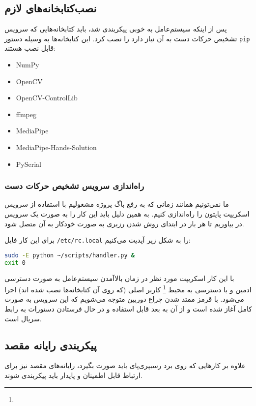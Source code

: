 \documentclass{article}
\begin{document}
\subsection{نصب‌کتابخانه‌های لازم}
پس از اینکه سیستم‌عامل به خوبی پیکربندی شد، باید کتابخانه‌هایی که سرویس تشخیص حرکات دست به آن نیاز دارد را نصب کرد. این کتابخانه‌ها به وسیله دستور
\verb~pip~
قابل نصب هستند:
\begin{latin}
    \begin{itemize}
        \item NumPy
        \item OpenCV
        \item OpenCV-ControlLib
        \item ffmpeg
        \item MediaPipe
        \item MediaPipe-Hands-Solution
        \item PySerial
    \end{itemize}
\end{latin}

\subsubsection{راه‌اندازی سرویس تشخیص حرکات دست}
ما نمی‌تونیم همانند زمانی که به رفع باگ پروژه مشغولیم با استفاده از سرویس 
اسکریپت پایتون را راه‌اندازی کنیم. به همین دلیل باید این کار را به صورت یک سرویس در بیاوریم
تا هر بار در ابتدای روش شدن رزبری به صورت خودکار به آن متصل شود.

برای این کار فایل
\verb~/etc/rc.local~
را به شکل زیر آپدیت می‌کنیم:
\begin{latin}
\begin{lstlisting}[language=bash]
sudo -E python ~/scripts/handler.py &
exit 0
\end{lstlisting}	
\end{latin}

با این کار اسکریپت مورد نظر در زمان بالاآمدن سیستم‌عامل به صورت دسترسی ادمین و با دسترسی به
محیط \footnote{} کاربر اصلی (که روی آن کتابخانه‌ها نصب شده اند) اجرا می‌شود.
با قرمز ممتد شدن چراغ دوربین متوجه می‌شویم که این سرویس به صورت کامل آغاز شده است و از آن به بعد قابل استفاده و در حال فرستادن دستورات به رابط سریال است.

\subsection{پیکربندی رایانه مقصد}
علاوه بر کارهایی که روی برد رسبپری‌پای باید صورت بگیرد، رایانه‌های مقصد نیز برای ارتباط قابل اطمینان و پایدار باید پیکربندی شوند.
\end{document}
